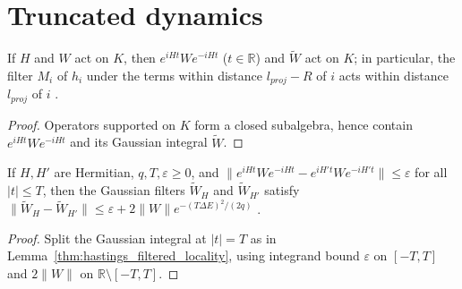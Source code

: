 \section{Truncated dynamics}
\label{sec:gaussian_filtered_truncated_dynamics}

\begin{lemma}
    \label{thm:hastings_truncated_support}
    \leanok
    If $H$ and $W$ act on $K$, then $e^{iHt}We^{-iHt}$ ($t\in\mathbb R$) and
    $\widetilde W$ act on $K$; in particular, the filter $M_i$ of $h_i$ under the terms within distance
    $l_{proj}-R$ of $i$ acts within distance $l_{proj}$ of $i$
    \cite[lines 302--304]{Hastings2006Solving}.
\end{lemma}
\begin{proof}
    \leanok
    Operators supported on $K$ form a closed subalgebra, hence contain
    $e^{iHt}We^{-iHt}$ and its Gaussian integral $\widetilde W$.
\end{proof}

\begin{lemma}
    \label{thm:hastings_truncated_filter_comparison}
    \leanok
    If $H,H'$ are Hermitian, $q,T,\varepsilon\ge0$, and
    $\|e^{iHt}We^{-iHt}-e^{iH't}We^{-iH't}\|\le\varepsilon$ for all $|t|\le T$,
    then the Gaussian filters $\widetilde W_H$ and $\widetilde W_{H'}$ satisfy
    $\|\widetilde W_H-\widetilde W_{H'}\|\le\varepsilon+2\|W\|e^{-(T\Delta E)^2/(2q)}$
    \cite[eq.~(dmi), lines 1524--1533]{Hastings2006Solving}.
\end{lemma}
\begin{proof}
    \leanok
    Split the Gaussian integral at $|t|=T$ as in
    Lemma~\ref{thm:hastings_filtered_locality}, using integrand bound
    $\varepsilon$ on $[-T,T]$ and $2\|W\|$ on $\mathbb R\setminus[-T,T]$.
\end{proof}

